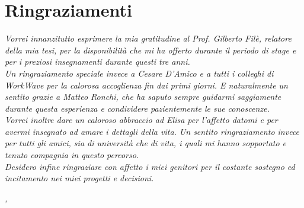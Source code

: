 
\cleardoublepage
{}
{}


\bigskip

\begingroup
\let\clearpage\relax
\let\cleardoublepage\relax
\let\cleardoublepage\relax

\chapter*{Ringraziamenti}

\noindent \textit{Vorrei innanzitutto esprimere la mia gratitudine al Prof. Gilberto Filè, relatore della mia tesi, per la disponibilità che mi ha offerto durante il periodo di stage e per i preziosi insegnamenti durante questi tre anni.}\\

\noindent \textit{Un ringraziamento speciale invece a Cesare D'Amico e a tutti i colleghi di WorkWave per la calorosa accoglienza fin dai primi giorni. E naturalmente un sentito grazie a Matteo Ronchi, che ha saputo sempre guidarmi saggiamente durante questa esperienza e condividere pazientemente le sue conoscenze.}\\

\noindent \textit{Vorrei inoltre dare un caloroso abbraccio ad Elisa per l'affetto datomi e per avermi insegnato ad amare i dettagli della vita. Un sentito ringraziamento invece per tutti gli amici, sia di università che di vita, i quali mi hanno sopportato e tenuto compagnia in questo percorso.}\\

\noindent \textit{Desidero infine ringraziare con affetto i miei genitori per il costante sostegno ed incitamento nei miei progetti e decisioni.}\\

\bigskip

\noindent\textit{\myLocation, \myTime}
\hfill \myName

\endgroup

